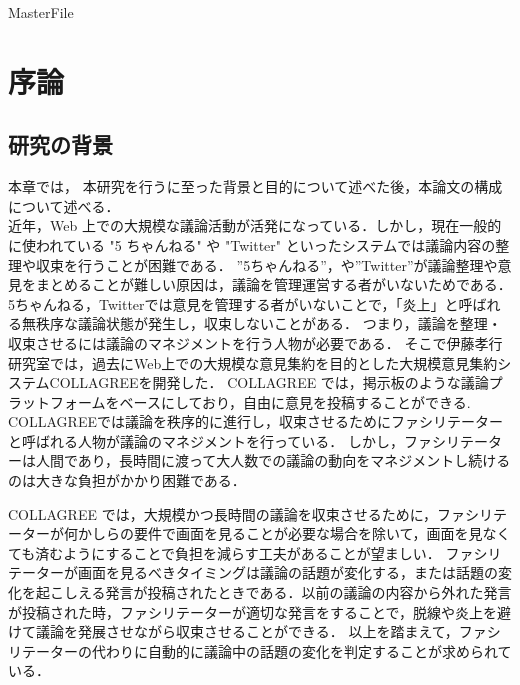 \expandafter\ifx\csname MasterFile\endcsname\relax
	\def\SubFile{hoge}
	
	
	\setcounter{chapter}{0}
	\fi
\cleardoublepage
\chapter{序論}
\label{intro:chapter}
\section{研究の背景}
\label{intro:background}
本章では， 本研究を行うに至った背景と目的について述べた後，本論文の構成について述べる．\\
近年，Web 上での大規模な議論活動が活発になっている．しかし，現在一般的に使われている "5 ちゃんねる" や "Twitter" といったシステムでは議論内容の整理や収束を行うことが困難である．
”5ちゃんねる”，や”Twitter”が議論整理や意見をまとめることが難しい原因は，議論を管理運営する者がいないためである． 5ちゃんねる，Twitterでは意見を管理する者がいないことで，「炎上」と呼ばれる無秩序な議論状態が発生し，収束しないことがある．
つまり，議論を整理・収束させるには議論のマネジメントを行う人物が必要である．
そこで伊藤孝行研究室では，過去にWeb上での大規模な意見集約を目的とした大規模意見集約システムCOLLAGREE\cite{collagreeTest}を開発した．
COLLAGREE では，掲示板のような議論プラットフォームをベースにしており，自由に意見を投稿することができる.
COLLAGREEでは議論を秩序的に進行し，収束させるためにファシリテーターと呼ばれる人物が議論のマネジメントを行っている．
しかし，ファシリテーターは人間であり，長時間に渡って大人数での議論の動向をマネジメントし続けるのは大きな負担がかかり困難である．

COLLAGREE では，大規模かつ長時間の議論を収束させるために，ファシリテーターが何かしらの要件で画面を見ることが必要な場合を除いて，画面を見なくても済むようにすることで負担を減らす工夫があることが望ましい．
ファシリテーターが画面を見るべきタイミングは議論の話題が変化する，または話題の変化を起こしえる発言が投稿されたときである．以前の議論の内容から外れた発言が投稿された時，ファシリテーターが適切な発言をすることで，脱線や炎上を避けて議論を発展させながら収束させることができる．
以上を踏まえて，ファシリテーターの代わりに自動的に議論中の話題の変化を判定することが求められている．

